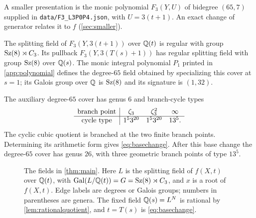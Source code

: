 A smaller presentation is the monic polynomial $F_3(Y,U)$ of bidegree
$(65,7)$ supplied in \texttt{data/F3\_L3P0P4.json}, with $U=3(t+1)$.
An exact change of generator relates it to $f$ (\cref{sec:smaller}).

\begin{corollary}\label{cor:smaller}
The splitting field of $F_3(Y,3(t+1))$ over $\mathbb{Q}(t)$ is regular with group
$\operatorname{Sz}(8)\rtimes C_3$. Its pullback $F_3(Y,3(T(s)+1))$ has regular splitting
field with group $\operatorname{Sz}(8)$ over $\mathbb{Q}(s)$. The monic integral polynomial
$P_1$ printed in \cref{app:polynomial} defines the degree-$65$ field
obtained by specializing this cover at $s=1$; its Galois group over $\mathbb{Q}$
is $\operatorname{Sz}(8)$ and its signature is $(1,32)$.
\end{corollary}

The auxiliary degree-$65$ cover has genus $6$ and branch-cycle types
\begin{equation}\label{eq:passport}
 \begin{array}{c|ccc}
 \text{branch point}&\zeta_3&\zeta_3^2&\infty\\ \hline
 \text{cycle type}&1^5 3^{20}&1^5 3^{20}&13^5.
 \end{array}
\end{equation}
The cyclic cubic quotient is branched at the two finite branch points.
Determining its arithmetic form gives \eqref{eq:basechange}.
After this base change the degree-$65$ cover has genus $26$, with three
geometric branch points of type $13^5$.

\begin{figure}[ht]
\centering
{}
\caption{The fields in \cref{thm:main}. Here $L$ is the splitting field of
$f(X,t)$ over $\mathbb{Q}(t)$, with $\operatorname{Gal}(L/\mathbb{Q}(t))=G=\operatorname{Sz}(8)\rtimes C_3$, and $x$ is a
root of $f(X,t)$. Edge labels are degrees or Galois groups; numbers in
parentheses are genera. The fixed field $\mathbb{Q}(s)=L^N$ is rational by
\cref{lem:rationalquotient}, and $t=T(s)$ is \eqref{eq:basechange}.}
\label{fig:tower}
\end{figure}

